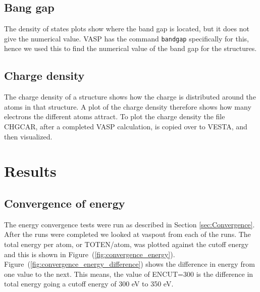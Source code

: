 \documentclass{article}
\begin{document}
  \subsection{Bang gap}

    The density of states plots show where the band gap is located, but it does not give the numerical value. VASP has the command \texttt{bandgap} specifically for this, hence we used this to find the numerical value of the band gap for the structures. \\


  \subsection{Charge density}

    The charge density of a structure shows how the charge is distributed around the atoms in that structure. A plot of the charge density therefore shows how many electrons the different atoms attract. To plot the charge density the file CHGCAR, after a completed VASP calculation, is copied over to VESTA, and then visualized.


\vspace{1cm}

\section{Results}   \label{sec:Results}

  \subsection{Convergence of energy}

     The energy convergence tests were run as described in Section \ref{sec:Convergence}. After the runs were completed we looked at vaspout from each of the runs. The total energy per atom, or TOTEN/atom, was plotted against the cutoff energy and this is shown in Figure~(\ref{fig:convergence_energy}). \\

     Figure~(\ref{fig:convergence_energy_difference}) shows the difference in energy from one value to the next. This means, the value of ENCUT=300 is the difference in total energy going a cutoff energy of 300 eV to 350 eV. \\
\end{document}
